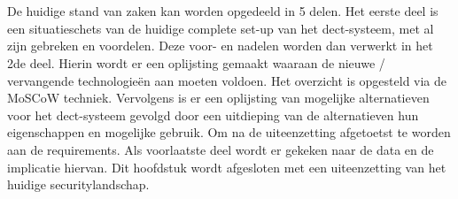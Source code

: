 \chapter{}%
\label{ch:stand-van-zaken}



De huidige stand van zaken kan worden opgedeeld in 5 delen. Het eerste deel is een situatieschets van de huidige complete set-up van het \gls{dect}-systeem, met al zijn gebreken en voordelen. Deze voor- en nadelen worden dan verwerkt in het 2de deel. Hierin wordt er een oplijsting gemaakt waaraan de nieuwe / vervangende technologieën aan moeten voldoen. Het overzicht is opgesteld via de MoSCoW techniek. Vervolgens is er een oplijsting van mogelijke alternatieven voor het \gls{dect}-systeem gevolgd door een uitdieping van de alternatieven hun eigenschappen en mogelijke gebruik. Om na de uiteenzetting afgetoetst te worden aan de requirements. Als voorlaatste deel wordt er gekeken naar de data en de implicatie hiervan. Dit hoofdstuk wordt afgesloten met een uiteenzetting van het huidige  securitylandschap.

